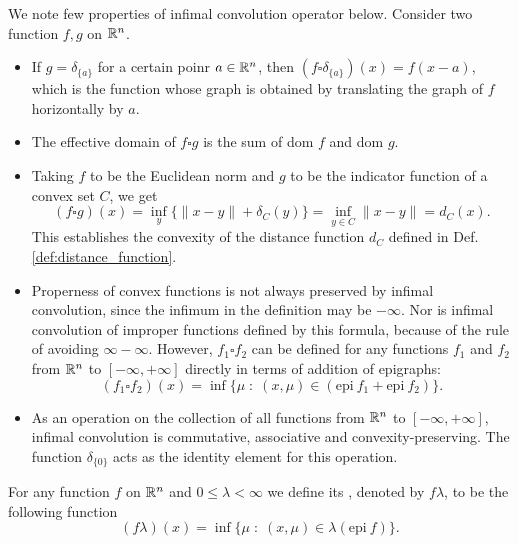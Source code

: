 \documentclass[11pt,a4paper]{article}
\begin{document}
\begin{remark}
    We note few properties of infimal convolution operator below. Consider two function $f,g$ on $\mathbb{R}^n$.
    \begin{itemize}
        \item If $g = \delta_{\{a\}}$ for a certain poinr $a\in \mathbb{R}^n$, then $(f\square \delta_{\{a\}})(x) = f(x-a)$, which is the function whose graph is obtained by translating the graph of $f$ horizontally by $a$.
        \item The effective domain of $f\square g$ is the sum of dom $f$ and dom $g$.
        \item Taking $f$ to be the Euclidean norm and $g$ to be the indicator function of a convex set $C$, we get
        \begin{equation*}
            (f\square g)(x) = \inf_y \{\|x-y\|+\delta_C(y)\} = \inf_{y\in C} \|x-y\| = d_C(x).
        \end{equation*}
        This establishes the convexity of the distance function $d_C$ defined in Def. \ref{def:distance_function}.
        \item Properness of convex functions is not always preserved by infimal convolution, since the infimum in the definition may be $-\infty$. Nor is infimal convolution of improper functions defined by this formula, because of the rule of avoiding $\infty-\infty$. However, $f_1\square f_2$ can be defined for any functions $f_1$ and $f_2$ from $\mathbb{R}^n$ to $[-\infty,+\infty]$ directly in terms of addition of epigraphs:
        \begin{equation*}
            (f_1\square f_2)(x) = \inf\{\mu\;:\; (x,\mu)\in (\mathrm{epi}\ f_1+\mathrm{epi}\ f_2)\}.
        \end{equation*}
        \item As an operation on the collection of all functions from $\mathbb{R}^n$ to $[-\infty,+\infty]$, infimal convolution is commutative, associative and convexity-preserving. The function $\delta_{\{0\}}$ acts as the identity element for this operation. 
    \end{itemize}
\end{remark}

\begin{definition}
    For any function $f$ on $\mathbb{R}^n$ and $0\le\lambda<\infty$ we define its , denoted by $f\lambda$, to be the following function
    \begin{equation*}
        (f\lambda)(x) = \inf\{\mu\;:\;(x,\mu)\in \lambda (\mathrm{epi}\ f)\}.
    \end{equation*}
\end{definition}
\end{document}
